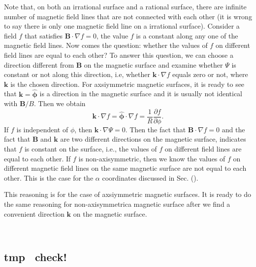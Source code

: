 \documentclass{llncs}
\newcommand{\tmmathbf}[1]{\ensuremath{\boldsymbol{#1}}}
\begin{document}
Note that, on both an irrational surface and a rational surface, there are
infinite number of magnetic field lines that are not connected with each other
(it is wrong to say there is only one magnetic field line on a irrational
surface). Consider a field $f$ that satisfies $\mathbf{B} \cdot \nabla f = 0$,
the value $f$ is a constant along any one of the magnetic field lines. Now
comes the question: whether the values of $f$ on different field lines are
equal to each other? To answer this question, we can choose a direction
different from $\mathbf{B}$ on the magnetic surface and examine whether $\Psi$
is constant or not along this direction, i.e, whether $\mathbf{k} \cdot \nabla
f$ equals zero or not, where $\mathbf{k}$ is the chosen direction. For
axsiymmetric magnetic surfaces, it is ready to see that $\mathbf{k}=
\hat{\tmmathbf{\phi}}$ is a direction in the magnetic surface and it is
usually not identical with $\mathbf{B}/ B$. Then we obtain
\begin{equation}
  \mathbf{k} \cdot \nabla f = \hat{\tmmathbf{\phi}} \cdot \nabla f =
  \frac{1}{R}  \frac{\partial f}{\partial \phi} .
\end{equation}
If $f$ is independent of $\phi$, then $\mathbf{k} \cdot \nabla \Psi = 0$. Then
the fact that $\mathbf{B} \cdot \nabla f = 0$ and the fact that $\mathbf{B}$
and $\mathbf{k}$ are two different directions on the magnetic surface,
indicates that $f$ is constant on the surface, i.e., the values of $f$ on
different field lines are equal to each other. If $f$ is non-axisymmetric,
then we know the values of $f$ on different magnetic field lines on the same
magnetic surface are not equal to each other. This is the case for the
$\alpha$ coordinates discussed in Sec. ().

This reasoning is for the case of axsiymmetric magnetic surfaces. It is ready
to do the same reasoning for non-axisymmetrica magnetic surface after we find
a convenient direction $\mathbf{k}$ on the magnetic surface.

\

\subsection{tmp \ check!}
\end{document}

